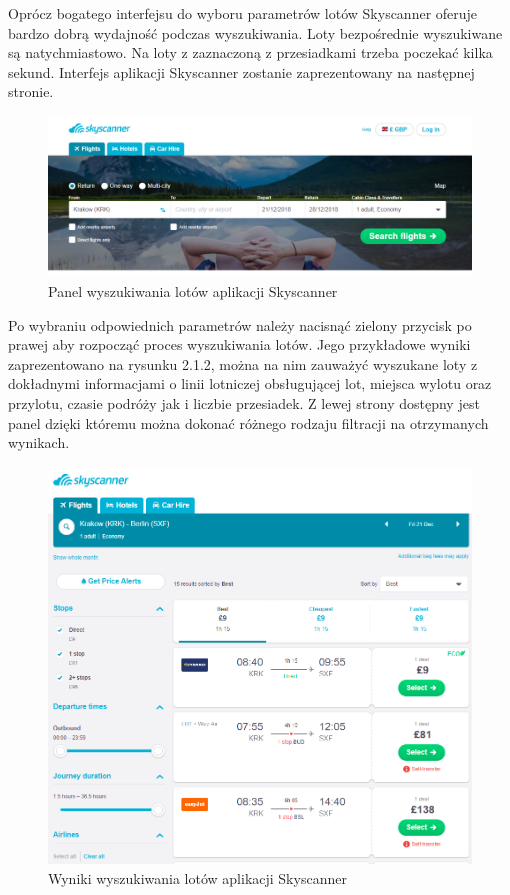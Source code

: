 \documentclass[12pt, twoside]{report}
\begin{document}
Oprócz bogatego interfejsu do wyboru parametrów lotów Skyscanner oferuje bardzo dobrą wydajność podczas wyszukiwania. Loty bezpośrednie wyszukiwane są natychmiastowo. Na loty z zaznaczoną z przesiadkami trzeba poczekać kilka sekund. Interfejs aplikacji Skyscanner zostanie zaprezentowany na następnej stronie.
\newpage
\begin{figure}[!ht]
\centering
\includegraphics[scale=0.50, keepaspectratio]{skyscanner_main.png}
\caption{Panel wyszukiwania lotów aplikacji Skyscanner}
\label{fig:skyscanner_main}
\end{figure}
Po wybraniu odpowiednich parametrów należy nacisnąć zielony przycisk po prawej aby rozpocząć 
proces wyszukiwania lotów. Jego przykładowe wyniki zaprezentowano na rysunku 2.1.2, można na nim zauważyć wyszukane loty z dokładnymi informacjami o linii lotniczej obsługującej lot, miejsca wylotu oraz przylotu, czasie podróży jak i liczbie przesiadek. Z lewej strony dostępny jest panel dzięki któremu można dokonać różnego rodzaju filtracji na otrzymanych wynikach.
\begin{figure}[!ht]
\centering
\includegraphics[scale=0.45, keepaspectratio]{skyscanner_result.png}
\caption{Wyniki wyszukiwania lotów aplikacji Skyscanner}
\label{fig:skyscanner_result}
\end{figure}
\end{document}
